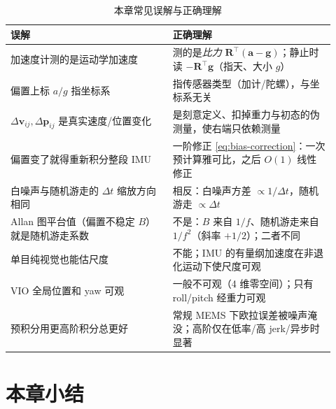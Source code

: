 \begin{table}[H]\centering\small
\caption{本章常见误解与正确理解}
\begin{tabular}{p{0.46\linewidth}p{0.46\linewidth}}
\toprule
误解 & 正确理解 \\
\midrule
加速度计测的是运动学加速度 & 测的是\emph{比力} $\mathbf R^\top(\mathbf a-\mathbf g)$；静止时读 $-\mathbf R^\top\mathbf g$（指天、大小 $g$） \\
偏置上标 $a/g$ 指坐标系 & 指传感器类型（加计/陀螺），与坐标系无关 \\
$\Delta\mathbf v_{ij},\Delta\mathbf p_{ij}$ 是真实速度/位置变化 & 是刻意定义、扣掉重力与初态的伪测量，使右端只依赖测量 \\
偏置变了就得重新积分整段 IMU & 一阶修正 \cref{eq:bias-correction}：一次预计算雅可比，之后 $O(1)$ 线性修正 \\
白噪声与随机游走的 $\Delta t$ 缩放方向相同 & 相反：白噪声方差 $\propto1/\Delta t$，随机游走 $\propto\Delta t$ \\
Allan 图平台值（偏置不稳定 $B$）就是随机游走系数 & 不是：$B$ 来自 $1/f$、随机游走来自 $1/f^2$（斜率 $+1/2$）；二者不同 \\
单目纯视觉也能估尺度 & 不能；IMU 的有量纲加速度在非退化运动下使尺度可观 \\
VIO 全局位置和 yaw 可观 & 一般不可观（4 维零空间）；只有 roll/pitch 经重力可观 \\
预积分用更高阶积分总更好 & 常规 MEMS 下欧拉误差被噪声淹没；高阶仅在低率/高 jerk/异步时显著 \\
\bottomrule
\end{tabular}
\end{table}

\section*{本章小结}

